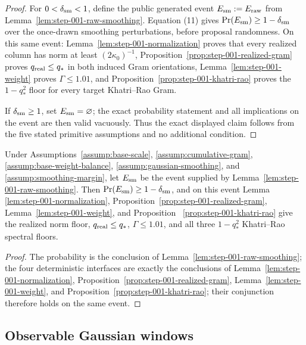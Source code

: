 \begin{proof}
For $0<\delta_{\rm sm}<1$, define the public generated event
$E_{\rm sm}:=E_{\rm raw}$ from
Lemma~\ref{lem:step-001-raw-smoothing}. Equation (11) gives
$\Pr(E_{\rm sm})\ge1-\delta_{\rm sm}$ over the once-drawn smoothing
perturbations, before proposal randomness. On this same event:
Lemma~\ref{lem:step-001-normalization} proves that every realized column has
norm at least $(2\kappa _0)^{-1}$,
Proposition~\ref{prop:step-001-realized-gram} proves
$q_{\rm real}\le q_*$ in both induced Gram orientations,
Lemma~\ref{lem:step-001-weight} proves $\Gamma\le1.01$, and
Proposition~\ref{prop:step-001-khatri-rao} proves the $1-q_*^2$ floor for
every target Khatri--Rao Gram.

If $\delta_{\rm sm}\ge1$, set $E_{\rm sm}=\varnothing$; the exact
probability statement and all implications on the event are then valid
vacuously. Thus the exact displayed claim follows from the five stated
primitive assumptions and no additional condition.
\end{proof}

\begin{proposition}\label{prop:step-001-geometry}
Under Assumptions~\ref{assump:base-scale},
\ref{assump:cumulative-gram}, \ref{assump:base-weight-balance},
\ref{assump:gaussian-smoothing}, and
\ref{assump:smoothing-margin}, let $E_{\rm sm}$ be the event supplied by
Lemma~\ref{lem:step-001-raw-smoothing}.  Then
$\Pr(E_{\rm sm})\ge1-\delta_{\rm sm}$, and on this event Lemma~
\ref{lem:step-001-normalization}, Proposition~\ref{prop:step-001-realized-gram},
Lemma~\ref{lem:step-001-weight}, and Proposition~
\ref{prop:step-001-khatri-rao} give the realized norm floor,
$q_{\rm real}\le q_*$, $\Gamma\le1.01$, and all three
$1-q_*^2$ Khatri--Rao spectral floors.
\begin{proof}
The probability is the conclusion of Lemma~\ref{lem:step-001-raw-smoothing};
 the four deterministic interfaces are exactly the conclusions of
 Lemma~\ref{lem:step-001-normalization}, Proposition~\ref{prop:step-001-realized-gram},
 Lemma~\ref{lem:step-001-weight}, and Proposition~\ref{prop:step-001-khatri-rao};
 their conjunction therefore holds on the same event.
\end{proof}
\end{proposition}


\subsection{Observable Gaussian windows}\label{app:step-002}


